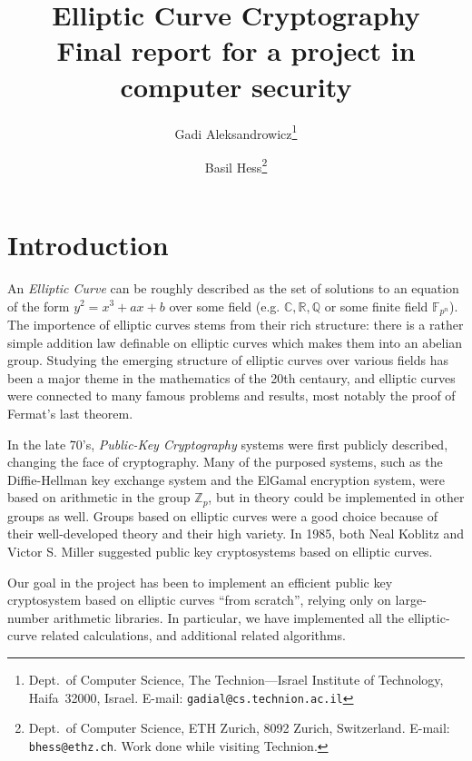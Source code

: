 \documentclass[11pt,english]{article}
\begin{document}

\title{Elliptic Curve Cryptography\\Final report for a project in computer security}


\author{
   Gadi Aleksandrowicz\thanks{
      Dept.\ of Computer Science,
      The Technion---Israel Institute of Technology,
      Haifa~32000, Israel.
      E-mail: {\tt gadial@cs.technion.ac.il}
   } \and
   Basil Hess\thanks{
      Dept.\ of Computer Science,
      ETH Zurich,
      8092 Zurich, Switzerland.
      E-mail: {\tt bhess@ethz.ch}. Work done while visiting Technion.
   }
}

\date{}

\maketitle

\section{Introduction}
An \emph{Elliptic Curve} can be roughly described as the set of solutions to an equation of the form $y^2=x^3+ax+b$ over some field (e.g. $\mathbb{C}, 
\mathbb{R},\mathbb{Q}$ or some finite field $\mathbb{F}_{p^n}$). The importence of elliptic curves stems from their rich structure: there is a rather simple
addition law definable on elliptic curves which makes them into an abelian group. Studying the emerging structure of elliptic curves over various fields has been a
major theme in the mathematics of the 20th centaury, and elliptic curves were connected to many famous problems and results, most notably the proof of Fermat's
last theorem.

In the late 70's, \emph{Public-Key Cryptography} systems were first publicly described, changing the face of cryptography. Many of the purposed systems, such
as the Diffie-Hellman key exchange system and the ElGamal encryption system, were based on arithmetic in the group $\mathbb{Z}_p$, but in theory could
be implemented in other groups as well. Groups based on elliptic curves were a good choice because of their well-developed theory and their high variety. In 1985,
both Neal Koblitz and Victor S. Miller  suggested public key cryptosystems based on elliptic curves.

Our goal in the project has been to implement an efficient public key cryptosystem based on elliptic curves ``from scratch'', relying only on large-number arithmetic
libraries. In particular, we have implemented all the elliptic-curve related calculations, and additional related algorithms.
\end{document}
